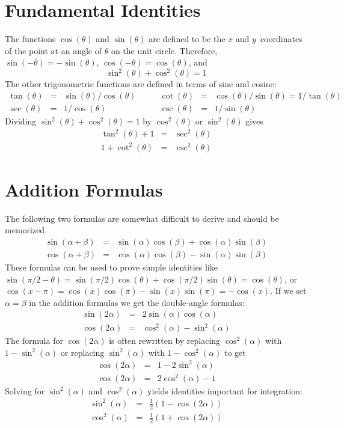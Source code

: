 \documentclass{article}
\begin{document}
	\section*{Fundamental Identities}
	The functions $\cos(\theta)$ and $\sin(\theta)$ are defined to be the $x$
	and $y$~coordinates of the point at an angle of $\theta$ on the unit circle.
	Therefore,
	$\sin(-\theta) = -\sin(\theta)$, $\cos(-\theta) = \cos(\theta)$, and
	\[
		\sin^2(\theta) + \cos^2(\theta) = 1
	\] 
	The other trigonometric functions are defined in terms of sine and cosine:
	\[
		\begin{array}{rclrcl}
			\tan(\theta) &=& \sin(\theta)/\cos(\theta)\quad & \quad
			\cot(\theta) &=& \cos(\theta)/\sin(\theta) = 1/\tan(\theta)\\
			\sec(\theta) &=& 1/\cos(\theta)\quad & \quad
			\csc(\theta) &=& 1/\sin(\theta)
		\end{array}
	\]
	Dividing $\sin^2(\theta) + \cos^2(\theta) = 1$ by
	$\cos^2(\theta)$ or $\sin^2(\theta)$ gives
	\begin{eqnarray*}
		\tan^2(\theta) + 1 &=& \sec^2(\theta)\\
		1 + \cot^2(\theta) &=& \csc^2(\theta)
	\end{eqnarray*}

	\section*{Addition Formulas}
	The following two formulas are somewhat difficult to derive and should
	be memorized.
	\begin{eqnarray*}
		\sin(\alpha+\beta) &=& \sin(\alpha)\cos(\beta) + \cos(\alpha)\sin(\beta) \\
		\cos(\alpha+\beta) &=& \cos(\alpha)\cos(\beta) - \sin(\alpha)\sin(\beta)
	\end{eqnarray*}
	These formulas can be used to prove simple identities like
	$\sin(\pi/2 - \theta) = \sin(\pi/2)\cos(\theta) + \cos(\pi/2)\sin(\theta) =
	\cos(\theta)$, or $\cos(x-\pi) = \cos(x)\cos(\pi) - \sin(x)\sin(\pi) =
	-\cos(x)$.  If we set $\alpha = \beta$ in the addition formulas we get the 
	double-angle formulas:
	\begin{eqnarray*}
		\sin(2\alpha) &=&  2\sin(\alpha)\cos(\alpha) \\
		\cos(2\alpha) &=& \cos^2(\alpha) - \sin^2(\alpha)
	\end{eqnarray*}
	The formula for $\cos(2\alpha)$ is often rewritten by replacing
	$\cos^2(\alpha)$ with $1-\sin^2(\alpha)$ or replacing $\sin^2(\alpha)$
	with $1-\cos^2(\alpha)$ to get
	\begin{eqnarray*}
		\cos(2\alpha) &=& 1 - 2\sin^2(\alpha) \\
		\cos(2\alpha) &=& 2\cos^2(\alpha) - 1
	\end{eqnarray*}
	Solving for $\sin^2(\alpha)$ and $\cos^2(\alpha)$ yields identities
	important for integration:
	\begin{eqnarray*}
		\sin^2(\alpha) &=& \frac{1}{2}(1 - \cos(2\alpha)) \\
		\cos^2(\alpha) &=& \frac{1}{2}(1 + \cos(2\alpha))
	\end{eqnarray*}
\end{document}
